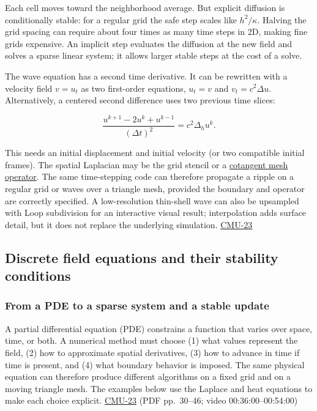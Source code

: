 Each cell moves toward the neighborhood average. But explicit diffusion is conditionally stable: for a regular grid the safe step scales like \(h^2/\kappa\). Halving the grid spacing can require about four times as many time steps in 2D, making fine grids expensive. An implicit step evaluates the diffusion at the new field and solves a sparse linear system; it allows larger stable steps at the cost of a solve.

The wave equation has a second time derivative. It can be rewritten with a velocity field \(v=u_t\) as two first-order equations, \(u_t=v\) and \(v_t=c^2\Delta u\). Alternatively, a centered second difference uses two previous time slices:

\[
\frac{u^{k+1}-2u^k+u^{k-1}}{(\Delta t)^2}=c^2\Delta_h u^k.
\]

This needs an initial displacement and initial velocity (or two compatible initial frames). The spatial Laplacian may be the grid stencil or a \hyperref[appendix-1988d465c119]{cotangent mesh operator}. The same time-stepping code can therefore propagate a ripple on a regular grid or waves over a triangle mesh, provided the boundary and operator are correctly specified. A low-resolution thin-shell wave can also be upsampled with Loop subdivision for an interactive visual result; interpolation adds surface detail, but it does not replace the underlying simulation. \hyperref[04-visual-computing-ii-ch036-cmu-23---physically-based-animation-and-pdes]{CMU-23}

\subsection{Discrete field equations and their stability conditions}\label{04-visual-computing-ii-ch030-discrete-field-equations-and-their-stability-conditions}

\subsubsection{From a PDE to a sparse system and a stable update}\label{04-visual-computing-ii-ch030-from-a-pde-to-a-sparse-system-and-a-stable-update}

A partial differential equation (PDE) constrains a function that varies over space, time, or both. A numerical method must choose (1) what values represent the field, (2) how to approximate spatial derivatives, (3) how to advance in time if time is present, and (4) what boundary behavior is imposed. The same physical equation can therefore produce different algorithms on a fixed grid and on a moving triangle mesh. The examples below use the Laplace and heat equations to make each choice explicit. \hyperref[04-visual-computing-ii-ch036-cmu-23---physically-based-animation-and-pdes]{CMU-23} (PDF pp.~30--46; video 00:36:00--00:54:00)

